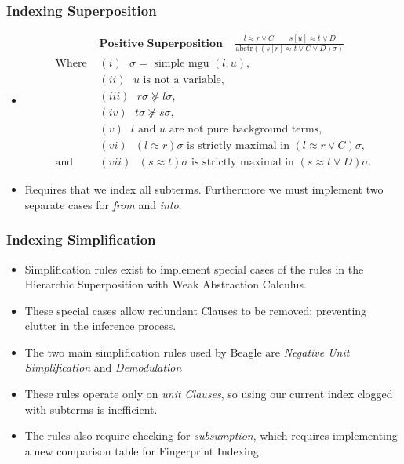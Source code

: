 \documentclass[10pt,xcolor={dvipsnames}]{beamer}
\newcommand{\HSWAC}{Hierarchic Superposition with Weak Abstraction Calculus}
\begin{document}
\begin{NoHyper}
\begin{frame}
  \frametitle{Indexing Superposition}
  \begin{itemize}
  \item<1->[]
  \begin{align*}
&\textbf{Positive Superposition}\ \ \ \ \  \frac{l \approx r \lor C\quad \quad s[u] \approx t \lor D}{\text{abstr}((s[r] \approx t \lor C \lor D)\sigma)}\\
\text{Where } &(i) \text{ $\sigma = $ simple mgu $(l,u)$,}\\
&(ii) \text{ $u$ is not a variable,}\\
&(iii) \text{ $r\sigma \not\succeq l\sigma$,}\\
&(iv) \text{ $t\sigma \not\succeq s\sigma$,}\\
&(v) \text{ $l$ and $u$ are not pure background terms,}\\
&(vi) \text{ $(l \approx r)\sigma$ is strictly maximal in $(l \approx r \lor C)\sigma$,}\\
\text{and } &(vii) \text{ $(s \approx t)\sigma$ is strictly maximal in $(s \approx t \lor D)\sigma$.}
\end{align*}
  \item<1-> Requires that we index all subterms. Furthermore we must implement two
  separate cases for \emph{from} and \emph{into}.

  \end{itemize}
\end{frame}

\begin{frame}
  \frametitle{Indexing Simplification}
  \begin{itemize}
  \item<1-> Simplification rules exist to implement special cases of the rules
  in the \HSWAC.
  \item<1-> These special cases allow redundant Clauses to be removed; preventing
  clutter in the inference process.
  \item<2-> The two main simplification rules used by Beagle are \emph{Negative Unit Simplification}
  and \emph{Demodulation}
  \item<3-> These rules operate only on \emph{unit Clauses}, so using our current
  index clogged with subterms is inefficient.
  \item<3-> The rules also require checking for \emph{subsumption}, which requires 
  implementing a new comparison table for Fingerprint Indexing.
  \end{itemize}
\end{frame}


\end{NoHyper}
\end{document}

